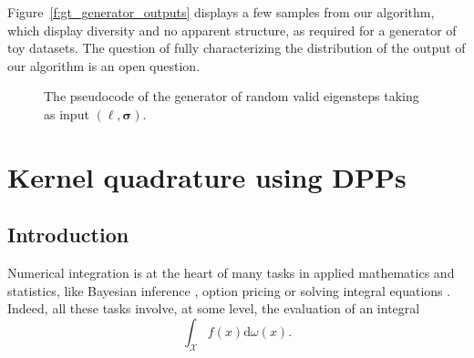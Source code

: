\documentclass[twoside,11pt]{book}
\numberwithin{theorem}{chapter}
\numberwithin{definition}{chapter}
\numberwithin{proposition}{chapter}
\numberwithin{corollary}{chapter}
\numberwithin{example}{chapter}
\numberwithin{lemma}{chapter}
\begin{document}

Figure~\ref{f:gt_generator_outputs} displays a few samples from our algorithm, which display diversity and no apparent structure, as required for a generator of toy datasets. The question of fully characterizing the distribution of the output of our algorithm is an open question.

\begin{figure}
\centerline{
}
\caption{The pseudocode of the generator of random valid eigensteps taking as input $(\bm{\ell},\bm{\sigma})$.}
\label{f:Algo_Random_Eigensteps}
\end{figure}

\chapter{Kernel quadrature using DPPs}
\section{Introduction}
Numerical integration is at the heart of many tasks in applied mathematics and statistics, like Bayesian inference \citep{RoCa04}, option pricing \citep{Gla13} or solving integral equations \citep{KrMaKo89}. Indeed, all these tasks involve, at some level, the evaluation of an integral
\begin{equation}\label{eq:general_integral_formula}
\int_{\mathcal{X}}f(x)\mathrm{d}\omega(x).
\end{equation}
\end{document}
